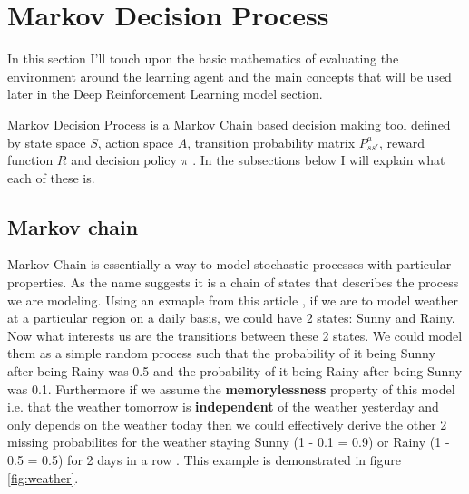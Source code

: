
 
\section{Markov Decision Process}

In this section I'll touch upon the basic mathematics of evaluating the environment around the learning agent and the 
main concepts that will be used later in the 
Deep Reinforcement Learning model section.

Markov Decision Process is a Markov Chain based decision making
tool defined by state space $S$, action space $A$, transition 
probability matrix $P^{a}_{ss'}$, reward 
function $R$ and decision policy $\pi$ \cite{lecture_mdp}. In 
the subsections below I will explain what each of these is.

\subsection{Markov chain}
Markov Chain is essentially a way to model stochastic
processes with particular properties. As the name suggests it is a chain of states that describes the process we are modeling. Using an exmaple from this article \cite{markov_chain_article}, if we
are to model weather at a particular region on a daily basis,
we could have 2 states: Sunny and Rainy. Now what interests us
are the transitions between these 2 states. We could model
them as a simple random process such that the probability of
it being Sunny after being Rainy was 0.5 and the probability
of it being Rainy after being Sunny was 0.1. Furthermore if we
assume the \textbf{memorylessness} property of this model i.e.
that the weather tomorrow is \textbf{independent} of the
weather yesterday and only depends on the weather today then
we could effectively derive the other 2 missing probabilites
for the weather staying Sunny (1 - 0.1 = 0.9) or Rainy (1 -
0.5 = 0.5) for 2 days in a row \cite{markov_chain_article}. This example is demonstrated in figure \ref{fig:weather}.

